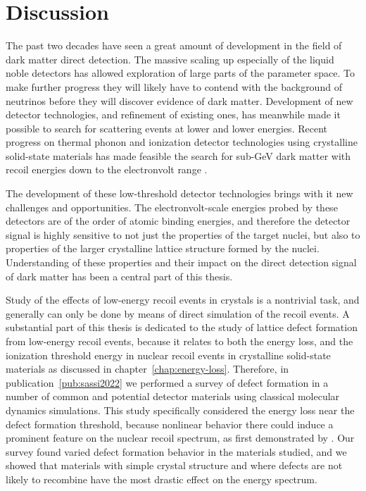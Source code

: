 \chapter{Discussion}

The past two decades have seen a great amount of development in the field of dark matter direct detection. The massive scaling up especially of the liquid noble detectors has allowed exploration of large parts of the parameter space. To make further progress they will likely have to contend with the background of neutrinos before they will discover evidence of dark matter. Development of new detector technologies, and refinement of existing ones, has meanwhile made it possible to search for scattering events at lower and lower energies. Recent progress on thermal phonon and ionization detector technologies using crystalline solid-state materials has made feasible the search for sub-GeV dark matter with recoil energies down to the electronvolt range \parencites{RomaniEtAl2018, CrislerEtAl2018, EDELWEISS2020}.

The development of these low-threshold detector technologies brings with it new challenges and opportunities. The electronvolt-scale energies probed by these detectors are of the order of atomic binding energies, and therefore the detector signal is highly sensitive to not just the properties of the target nuclei, but also to properties of the larger crystalline lattice structure formed by the nuclei. Understanding of these properties and their impact on the direct detection signal of dark matter has been a central part of this thesis.

Study of the effects of low-energy recoil events in crystals is a nontrivial task, and generally can only be done by means of direct simulation of the recoil events. A substantial part of this thesis is dedicated to the study of lattice defect formation from low-energy recoil events, because it relates to both the energy loss, and the ionization threshold energy in nuclear recoil events in crystalline solid-state materials as discussed in chapter~\ref{chap:energy-loss}. Therefore, in publication~\ref{pub:sassi2022} we performed a survey of defect formation in a number of common and potential detector materials using classical molecular dynamics simulations. This study specifically considered the energy loss near the defect formation threshold, because nonlinear behavior there could induce a prominent feature on the nuclear recoil spectrum, as first demonstrated by \textcite{KadribasicEtAl2020}. Our survey found varied defect formation behavior in the materials studied, and we showed that materials with simple crystal structure and where defects are not likely to recombine have the most drastic effect on the energy spectrum.

